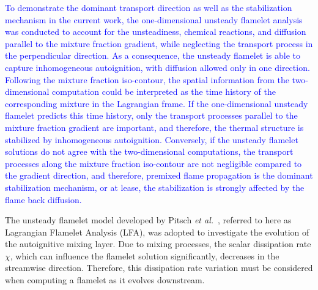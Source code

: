 \documentclass[review,3p,times]{elsarticle}
\begin{document}
\textcolor{blue}{To demonstrate the dominant transport direction as well as the stabilization mechanism in the current work, the one-dimensional unsteady flamelet analysis was conducted to account for the unsteadiness, chemical reactions, and diffusion parallel to the mixture fraction gradient, while neglecting the transport process in the perpendicular direction.  As a consequence, the unsteady flamelet is able to capture inhomogeneous autoignition, with diffusion allowed only in one direction.  Following the mixture fraction iso-contour, the spatial information from the two-dimensional computation could be interpreted as the time history of the corresponding mixture in the Lagrangian frame.  If the one-dimensional unsteady flamelet predicts this time history, only the transport processes parallel to the mixture fraction gradient are important, and therefore, the thermal structure is stabilized by inhomogeneous autoignition.  Conversely, if the unsteady flamelet solutions do not agree with the two-dimensional computations, the transport processes along the mixture fraction iso-contour are not negligible compared to the gradient direction, and therefore, premixed flame propagation is the dominant stabilization mechanism, or at lease, the stabilization is strongly affected by the flame back diffusion.}

The unsteady flamelet model developed by Pitsch \emph{et al.}~\cite{pitsch98a}, referred to here as Lagrangian Flamelet Analysis (LFA), was adopted to investigate the evolution of the autoignitive mixing layer.  Due to mixing processes, the scalar dissipation rate $\chi$, which can influence the flamelet solution significantly, decreases in the streamwise direction.  Therefore, this dissipation rate variation must be considered when computing a flamelet as it evolves downstream.
\end{document}
